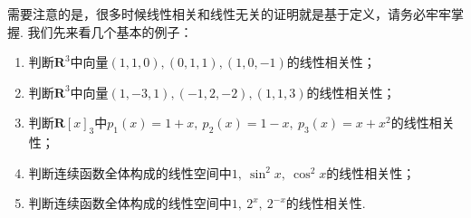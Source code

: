 需要注意的是，很多时候线性相关和线性无关的证明就是基于定义，请务必牢牢掌握. 我们先来看几个基本的例子：
\begin{example}
    \begin{enumerate}[label=(\arabic*)]
        \item 判断$\mathbf{R}^3$中向量$(1,1,0),(0,1,1),(1,0,-1)$的线性相关性；

        \item 判断$\mathbf{R}^3$中向量$(1,-3,1),(-1,2,-2),(1,1,3)$的线性相关性；

        \item \label{item:3:线性相关性:3}
              判断$\mathbf{R}[x]_3$中$p_1(x)=1+x,\ p_2(x)=1-x,\ p_3(x)=x+x^2$的线性相关性；

        \item 判断连续函数全体构成的线性空间中$1,\ \sin^2x,\ \cos^2x$的线性相关性；

        \item \label{item:3:线性相关性:5}
              判断连续函数全体构成的线性空间中$1,\ 2^x,\ 2^{-x}$的线性相关性.
    \end{enumerate}
\end{example}

